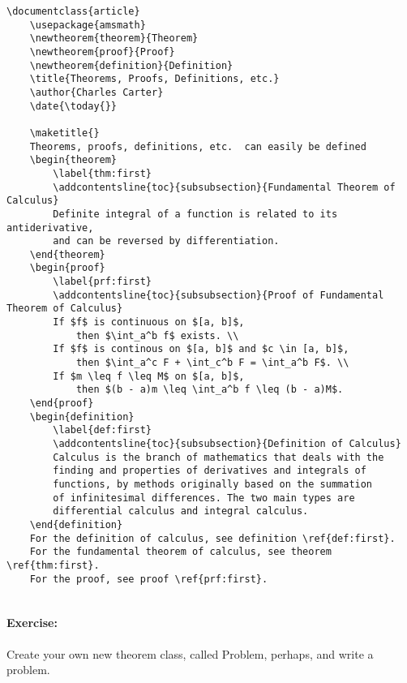         \begin{verbatim}
\documentclass{article}
    \usepackage{amsmath}
    \newtheorem{theorem}{Theorem}
    \newtheorem{proof}{Proof}
    \newtheorem{definition}{Definition}
    \title{Theorems, Proofs, Definitions, etc.}
    \author{Charles Carter}
    \date{\today{}}

    \maketitle{}
    Theorems, proofs, definitions, etc.  can easily be defined
    \begin{theorem}
        \label{thm:first}
        \addcontentsline{toc}{subsubsection}{Fundamental Theorem of Calculus}
        Definite integral of a function is related to its antiderivative, 
        and can be reversed by differentiation.
    \end{theorem}
    \begin{proof}
        \label{prf:first}
        \addcontentsline{toc}{subsubsection}{Proof of Fundamental Theorem of Calculus}
        If $f$ is continuous on $[a, b]$, 
            then $\int_a^b f$ exists. \\
        If $f$ is continous on $[a, b]$ and $c \in [a, b]$, 
            then $\int_a^c F + \int_c^b F = \int_a^b F$. \\
        If $m \leq f \leq M$ on $[a, b]$, 
            then $(b - a)m \leq \int_a^b f \leq (b - a)M$.
    \end{proof}
    \begin{definition}
        \label{def:first}
        \addcontentsline{toc}{subsubsection}{Definition of Calculus}
        Calculus is the branch of mathematics that deals with the 
        finding and properties of derivatives and integrals of 
        functions, by methods originally based on the summation 
        of infinitesimal differences. The two main types are 
        differential calculus and integral calculus.
    \end{definition}
    For the definition of calculus, see definition \ref{def:first}. 
    For the fundamental theorem of calculus, see theorem \ref{thm:first}. 
    For the proof, see proof \ref{prf:first}.
    
        \end{verbatim}

        \paragraph{Exercise:} Create your own new theorem class, called Problem, perhaps, and write a problem.

